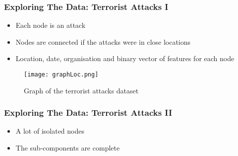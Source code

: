 \begin{frame}
\frametitle{Exploring The Data: Terrorist Attacks I}
	
	\begin{itemize}
		\item Each node is an attack
		\item Nodes are connected if the attacks were in close locations
		\item Location, date, organisation and binary vector of features for each node
	\end{itemize}
	
	\begin{figure}
		\begin{center}
			\texttt{[image: graphLoc.png]}
			\caption{Graph of the terrorist attacks dataset}
			\label{fig:graph attacks}
		\end{center}
	\end{figure}
\end{frame}

\begin{frame}
\frametitle{Exploring The Data: Terrorist Attacks II}
	
	\begin{center}
	\end{center}
	
	\begin{itemize}
		\item A lot of isolated nodes
		\item The sub-components are complete
	\end{itemize}
\end{frame}